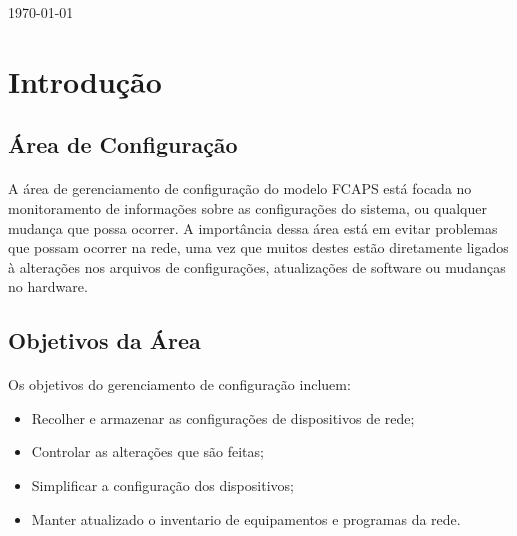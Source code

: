 \documentclass[a4paper]{article}
\begin{document}
\begin{titlepage}
          {\large \today}\\[2 cm]
          
          \vfill
          
          \end{titlepage}

    \tableofcontents
    \thispagestyle{empty}
    \pagebreak

    \section{Introdução}
    \subsection{Área de Configuração}
    \paragraph{}
    	A área de gerenciamento de configuração do modelo FCAPS está focada no monitoramento de informações sobre as configurações do sistema, ou qualquer mudança que possa ocorrer. A importância dessa área está em evitar problemas que possam ocorrer na rede, uma vez que muitos destes estão diretamente ligados à alterações nos arquivos de configurações, atualizações de software ou mudanças no hardware. 
    
    \subsection{Objetivos da Área}
    \paragraph{}
    Os objetivos do gerenciamento de configuração incluem:
    \begin{itemize}
	\item Recolher e armazenar as configurações de dispositivos de rede;
    \item Controlar as alterações que são feitas;
	\item Simplificar a configuração dos dispositivos;
    \item Manter atualizado o inventario de equipamentos e programas da rede.  
	\end{itemize}
  
\end{document}
